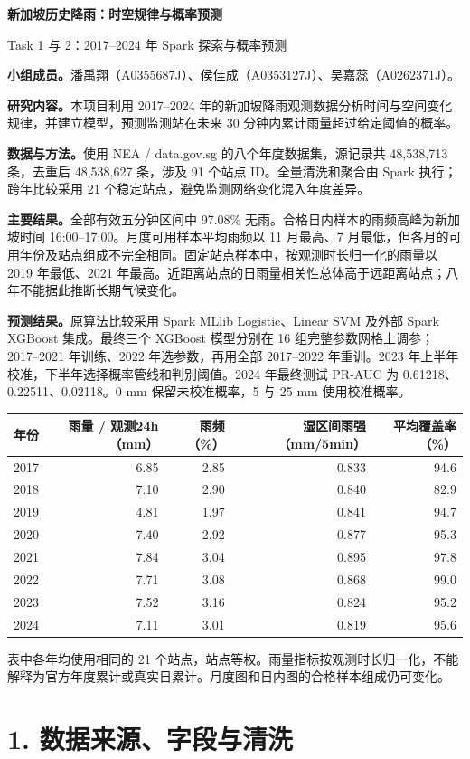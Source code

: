 \documentclass[UTF8,fontset=fandol,10pt,a4paper,landscape]{ctexart}
\begin{document}
{\LARGE\bfseries\color{ink} 新加坡历史降雨：时空规律与概率预测}\par
{\large Task 1 与 2：2017--2024 年 Spark 探索与概率预测}\par
\vspace{2mm}

\textbf{小组成员。}潘禹翔（A0355687J）、侯佳成（A0353127J）、吴嘉蕊（A0262371J）。

\textbf{研究内容。}本项目利用 2017--2024 年的新加坡降雨观测数据分析时间与空间变化规律，并建立模型，预测监测站在未来 30 分钟内累计雨量超过给定阈值的概率。

\textbf{数据与方法。}使用 NEA / data.gov.sg 的八个年度数据集，源记录共 48,538,713 条，去重后 48,538,627 条，涉及 91 个站点 ID。全量清洗和聚合由 Spark 执行；跨年比较采用 21 个稳定站点，避免监测网络变化混入年度差异。

\textbf{主要结果。}全部有效五分钟区间中 97.08\% 无雨。合格日内样本的雨频高峰为新加坡时间 16:00--17:00。月度可用样本平均雨频以 11 月最高、7 月最低，但各月的可用年份及站点组成不完全相同。固定站点样本中，按观测时长归一化的雨量以 2019 年最低、2021 年最高。近距离站点的日雨量相关性总体高于远距离站点；八年不能据此推断长期气候变化。

\textbf{预测结果。}原算法比较采用 Spark MLlib Logistic、Linear SVM 及外部 Spark XGBoost 集成。最终三个 XGBoost 模型分别在 16 组完整参数网格上调参；2017--2021 年训练、2022 年选参数，再用全部 2017--2022 年重训。2023 年上半年校准，下半年选择概率管线和判别阈值。2024 年最终测试 PR-AUC 为 0.61218、0.22511、0.02118。0 mm 保留未校准概率，5 与 25 mm 使用校准概率。

\begin{center}\begin{tabular}{rrrrr}
\toprule
年份 & 雨量 / 观测24h（mm） & 雨频（\%） & 湿区间雨强（mm/5min） & 平均覆盖率（\%）\\\midrule
2017 & 6.85 & 2.85 & 0.833 & 94.6\\
2018 & 7.10 & 2.90 & 0.840 & 82.9\\
2019 & 4.81 & 1.97 & 0.841 & 94.7\\
2020 & 7.40 & 2.92 & 0.877 & 95.3\\
2021 & 7.84 & 3.04 & 0.895 & 97.8\\
2022 & 7.71 & 3.08 & 0.868 & 99.0\\
2023 & 7.52 & 3.16 & 0.824 & 95.2\\
2024 & 7.11 & 3.01 & 0.819 & 95.6\\
\bottomrule\end{tabular}\end{center}
\noindent 表中各年均使用相同的 21 个站点，站点等权。雨量指标按观测时长归一化，不能解释为官方年度累计或真实日累计。月度图和日内图的合格样本组成仍可变化。\clearpage\section*{1. 数据来源、字段与清洗}
\end{document}
